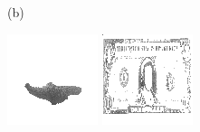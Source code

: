 \documentclass{article}
\begin{document}
\begin{figure}[t]
\begin{minipage}[c]{.21\linewidth}
  \end{minipage}
  \begin{minipage}[c]{.1\linewidth}
    \centering\centerline{(b)}
  \end{minipage}
  \begin{minipage}[c]{.21\linewidth}
    \centering\centerline{\includegraphics[width=\linewidth]{imgs/dennis_cal/airplane/sums/100_200.png}}
  \end{minipage}
  \begin{minipage}[c]{.21\linewidth}
    \centering\centerline{\includegraphics[width=\linewidth]{imgs/dennis_cal/dollar/sums/100_200.png}}

\end{minipage}
\end{figure}
\end{document}

